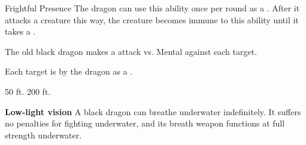     \begin{freeability}{Frightful Presence}
      The dragon can use this ability once per round as a .
      After it attacks a creature this way, the creature becomes immune to this ability until it takes a .
      \par The old black dragon makes a  attack
        vs. Mental against each target.
    
    \hit Each target is  by the dragon as a .
    \end{freeability}
  
      
       50 ft.
     200 ft.
    \par\noindent\textbf{Low-light vision}
        A black dragon can breathe underwater indefinitely.
        It suffers no penalties for fighting underwater, and its breath weapon functions at full strength underwater.
  

